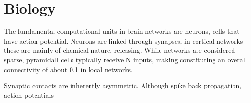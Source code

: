 \chapter{Biology}\label{ch:Biology} 


The fundamental computational units in brain networks are neurons,
cells that have action potential. Neurons are linked through synapses,
in cortical networks these are mainly of chemical nature,
releasing. While networks are considered sparse, pyramidalI cells
typically receive N inputs, making constituting an overall
connectivity of about 0.1 in local networks.

Synaptic contacts are inherently asymmetric. Although spike back
propagation, action potentials



